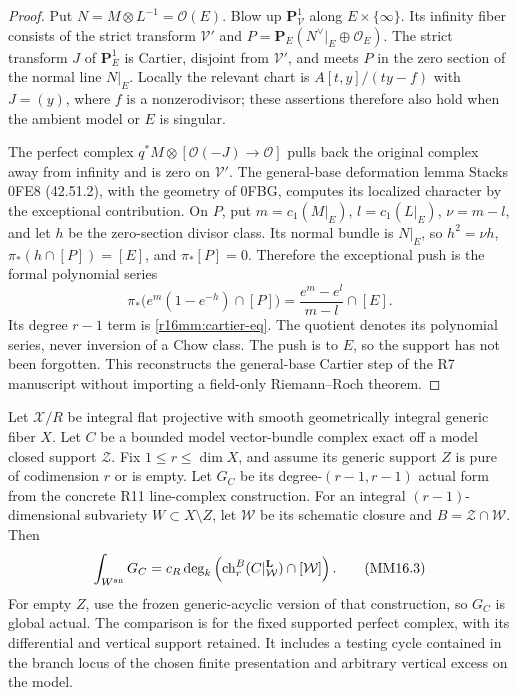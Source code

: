 \begin{proof}
Put $N=M\otimes L^{-1}=\mathcal O(E)$. Blow up
$\mathbf P^1_{\mathcal V}$ along $E\times\{\infty\}$.
Its infinity fiber consists of the strict transform
$\mathcal V'$ and $P=\mathbf P_E(N^\vee|_E\oplus\mathcal O_E)$.
The strict transform $J$ of $\mathbf P^1_E$ is Cartier, disjoint
from $\mathcal V'$, and meets $P$ in the zero section of the
normal line $N|_E$. Locally the relevant chart is
$A[t,y]/(ty-f)$ with $J=(y)$, where $f$ is a nonzerodivisor;
these assertions therefore also hold when the ambient model
or $E$ is singular.

The perfect complex $q^*M\otimes[\mathcal O(-J)\to\mathcal O]$
pulls back the original complex away from infinity and is zero
on $\mathcal V'$. The general-base deformation lemma Stacks
0FE8 (42.51.2), with the geometry of 0FBG, computes its localized
character by the exceptional contribution. On $P$, put
$m=c_1(M|_E)$, $l=c_1(L|_E)$, $\nu=m-l$, and let $h$ be
the zero-section divisor class. Its normal bundle is $N|_E$,
so $h^2=\nu h$, $\pi_*(h\cap[P])=[E]$, and $\pi_*[P]=0$.
Therefore the exceptional push is the formal polynomial series
\[
       \pi_*\bigl(e^m(1-e^{-h})\cap[P]\bigr)
                   =\frac{e^m-e^l}{m-l}\cap[E].
\]
Its degree $r-1$ term is \eqref{r16mm:cartier-eq}. The quotient
denotes its polynomial series, never inversion of a Chow class.
The push is to $E$, so the support has not been forgotten.
This reconstructs the general-base Cartier step of the R7
manuscript without importing a field-only Riemann--Roch theorem.
\end{proof}

\begin{theorem}
\label{r16mm:framed}
Let $\mathcal X/R$ be integral flat projective with smooth
geometrically integral generic fiber $X$. Let $C$ be a bounded
model vector-bundle complex exact off a model closed support
$\mathcal Z$. Fix $1\leq r\leq\dim X$, and assume its generic
support $Z$ is pure of codimension $r$ or is empty. Let $G_C$
be its degree-$(r-1,r-1)$ actual form from the
concrete R11 line-complex construction. For an integral
$(r-1)$-dimensional subvariety $W\subset X\setminus Z$, let
$\mathcal W$ be its schematic closure and
$B=\mathcal Z\cap\mathcal W$. Then
\[
 \int_{W^{\rm an}}G_C
       =c_R\deg_k\left(
          \operatorname{ch}_r^B(C|^{\mathbf L}_{\mathcal W})
                                  \cap[\mathcal W]\right).
 \tag{MM16.3}\label{r16mm:framed-eq}
\]
For empty $Z$, use the frozen generic-acyclic version of that
construction, so $G_C$ is global actual. The comparison is for
the fixed supported perfect complex, with
its differential and vertical support retained. It includes a
testing cycle contained in the branch locus of the chosen finite
presentation and arbitrary vertical excess on the model.
\end{theorem}

